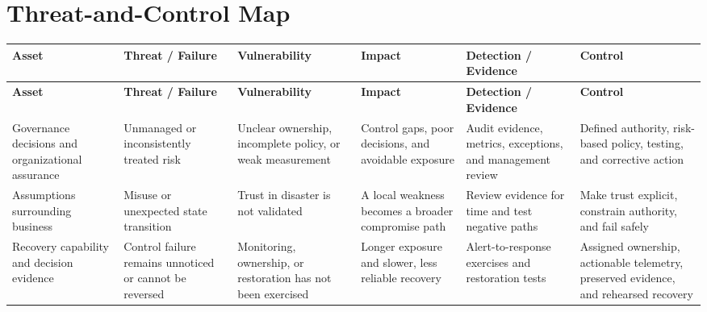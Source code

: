 \documentclass[11pt]{article}
\begin{document}
\section*{Threat-and-Control Map}
\begingroup\scriptsize\setlength{\tabcolsep}{2pt}
\begin{longtable}{>{\RaggedRight\arraybackslash}p{}>{\RaggedRight\arraybackslash}p{}>{\RaggedRight\arraybackslash}p{}>{\RaggedRight\arraybackslash}p{}>{\RaggedRight\arraybackslash}p{}>{\RaggedRight\arraybackslash}p{}}
\toprule\rowcolor{Navy}\color{white}\textbf{Asset} & \color{white}\textbf{Threat / Failure} & \color{white}\textbf{Vulnerability} & \color{white}\textbf{Impact} & \color{white}\textbf{Detection / Evidence} & \color{white}\textbf{Control}\\\midrule
\endfirsthead
\toprule\rowcolor{Navy}\color{white}\textbf{Asset} & \color{white}\textbf{Threat / Failure} & \color{white}\textbf{Vulnerability} & \color{white}\textbf{Impact} & \color{white}\textbf{Detection / Evidence} & \color{white}\textbf{Control}\\\midrule
\endhead
Governance decisions and organizational assurance & Unmanaged or inconsistently treated risk & Unclear ownership, incomplete policy, or weak measurement & Control gaps, poor decisions, and avoidable exposure & Audit evidence, metrics, exceptions, and management review & Defined authority, risk-based policy, testing, and corrective action\\\midrule
Assumptions surrounding business & Misuse or unexpected state transition & Trust in disaster is not validated & A local weakness becomes a broader compromise path & Review evidence for time and test negative paths & Make trust explicit, constrain authority, and fail safely\\\midrule
Recovery capability and decision evidence & Control failure remains unnoticed or cannot be reversed & Monitoring, ownership, or restoration has not been exercised & Longer exposure and slower, less reliable recovery & Alert-to-response exercises and restoration tests & Assigned ownership, actionable telemetry, preserved evidence, and rehearsed recovery\\\midrule
\bottomrule
\end{longtable}
\endgroup
\end{document}
